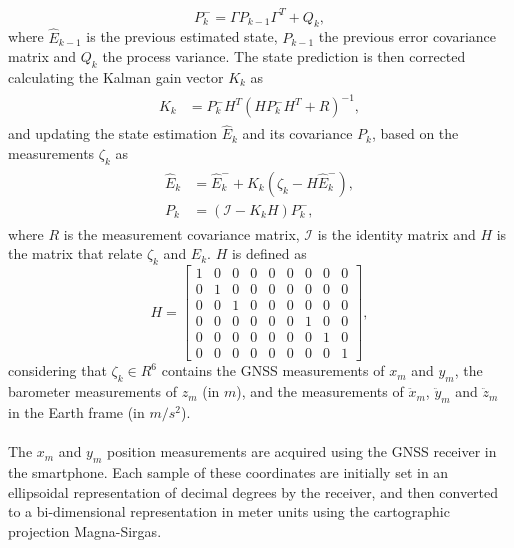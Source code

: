 \begin{equation}\label{eqn:covariancePrognosis}
P_{k}^{-} = \Gamma P_{k-1} \Gamma^{T} + Q_{k},
\end{equation}
where $\hat{E}_{k-1}$ is the previous estimated state, $P_{k-1}$ the previous error covariance matrix and $Q_{k}$ the process variance. The state prediction is then corrected calculating the Kalman gain vector $K_k$ as
\begin{align}\label{eqn:correctionKalman}
\begin{split}
K_{k} &= P^{-}_{k}H^{T}(HP^{-}_{k}H^{T} + R)^{-1},
\end{split}
\end{align}
and updating the state estimation $\hat{E}_{k}$ and its covariance $P_{k}$, based on the measurements $\zeta_k$ as
\begin{align}\label{eqn:correctionKalman2}
\begin{split}
\hat{E}_{k} &= \hat{E}^{-}_{k} + K_{k}(\zeta_{k} - H\hat{E}^{-}_{k}),\\
P_{k} &= (\mathcal{I} - K_{k}H)P^{-}_{k},
\end{split}
\end{align}
where $R$ is the measurement covariance matrix, $\mathcal{I}$ is the identity matrix and $H$ is the matrix that relate $\zeta_k$ and $E_k$. $H$ is defined as
\begin{equation}\label{eqn:H}
H =\begin{bmatrix}
			1 & 0 & 0 & 0 & 0 & 0 & 0 & 0 & 0\\
			0 & 1 & 0 & 0 & 0 & 0 & 0 & 0 & 0\\
			0 & 0 & 1 & 0 & 0 & 0 & 0 & 0 & 0\\
			0 & 0 & 0 & 0 & 0 & 0 & 1 & 0 & 0\\
			0 & 0 & 0 & 0 & 0 & 0 & 0 & 1 & 0\\
			0 & 0 & 0 & 0 & 0 & 0 & 0 & 0 & 1
			\end{bmatrix},
\end{equation}
considering that $\zeta_k \in R^{6}$ contains the GNSS measurements of $x_{m}$ and $y_{m}$, the barometer measurements of $z_{m}$ (in $m$), and the measurements of $\ddot{x}_{m}$, $\ddot{y}_{m}$ and $\ddot{z}_{m}$ in the Earth frame (in $m/s^{2}$).
\\\\
The $x_{m}$ and $y_{m}$ position measurements are acquired using the GNSS receiver in the smartphone. Each sample of these coordinates are initially set in an ellipsoidal representation of decimal degrees by the receiver, and then converted to a bi-dimensional representation in meter units using the cartographic projection Magna-Sirgas.
